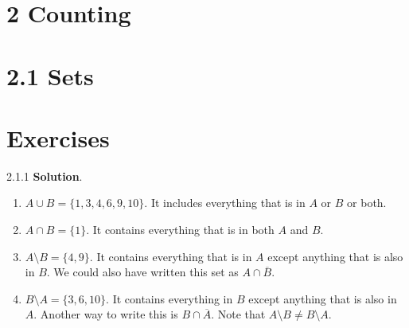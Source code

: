 \documentclass[11pt,]{book}
\theoremstyle{ptxplainnotitle}
\theoremstyle{ptxplaintitle}
\theoremstyle{ptxdefinitionnotitle}
\theoremstyle{ptxdefinitiontitle}
\theoremstyle{ptxdefinitionnotitle}
\theoremstyle{ptxdefinitiontitle}
\theoremstyle{ptxdefinitionnotitle}
\theoremstyle{ptxdefinitiontitle}
\theoremstyle{ptxdefinitiontitlenonumber}
\theoremstyle{ptxdefinitiontitlenonumber}
\numberwithin{equation}{chapter}
\renewcommand{\bar}{\overline}
\begin{document}
\section*{2 Counting}
\section*{2.1 Sets}
\section*{Exercises}
\begin{divisionexercise}{2.1.1}
\textbf{Solution}.\quad%
\hypertarget{p-778}{}%
\leavevmode%
\begin{enumerate}[label=\alph*.]
\item\hypertarget{li-342}{}\hypertarget{p-779}{}%
\(A \cup B = \{1,3,4,6,9,10\}\text{.}\)  It includes everything that is in \(A\) or \(B\) or both.%
\item\hypertarget{li-343}{}\hypertarget{p-780}{}%
\(A \cap B = \{1\}\text{.}\)  It contains everything that is in both \(A\) and \(B\text{.}\)%
\item\hypertarget{li-344}{}\hypertarget{p-781}{}%
\(A \setminus B = \{4, 9\}\text{.}\)  It contains everything that is in \(A\) except anything that is also in \(B\text{.}\)  We could also have written this set as \(A \cap \bar{B}\text{.}\)%
\item\hypertarget{li-345}{}\hypertarget{p-782}{}%
\(B \setminus A = \{3, 6, 10\}\text{.}\) It contains everything in \(B\) except anything that is also in \(A\text{.}\)  Another way to write this is \(B \cap \bar{A}\text{.}\)  Note that \(A \setminus B \ne B \setminus A\text{.}\)%
\end{enumerate}
%
\end{divisionexercise}%
\end{document}
